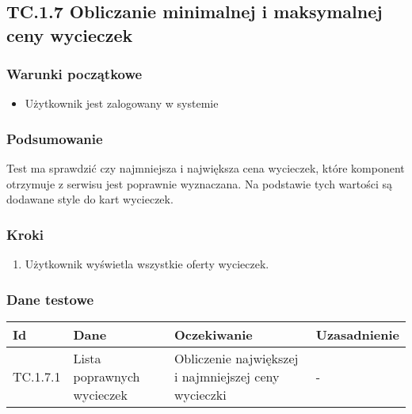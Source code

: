 \documentclass[a4paper,15pt]{article}
\begin{document}
\newpage
\begin{framed}
\subsection{TC.1.7 Obliczanie minimalnej i maksymalnej ceny wycieczek}


\vspace{0.5cm}

\subsubsection{Warunki początkowe}
\begin{itemize}
\item Użytkownik jest zalogowany w systemie
\end{itemize}

\subsubsection{Podsumowanie}
Test ma sprawdzić czy najmniejsza i największa cena wycieczek, które komponent otrzymuje z serwisu jest poprawnie wyznaczana. Na podstawie tych wartości są dodawane style do kart wycieczek. 

\subsubsection{Kroki}
\begin{enumerate}
\item Użytkownik wyświetla wszystkie oferty wycieczek.
\end{enumerate}

\subsubsection{Dane testowe}

\begin{center}
\begin{tabular}{ |C{1.5cm}|C{3cm}|C{4cm}|C{4cm}| } 
 \hline
 \textbf{Id} & \textbf{Dane} & \textbf{Oczekiwanie} & \textbf{Uzasadnienie} \\ \hline
 TC.1.7.1 & Lista poprawnych wycieczek & Obliczenie największej i najmniejszej ceny wycieczki & - \\ \hline
\end{tabular}
\end{center}

\end{framed}
\end{document}
